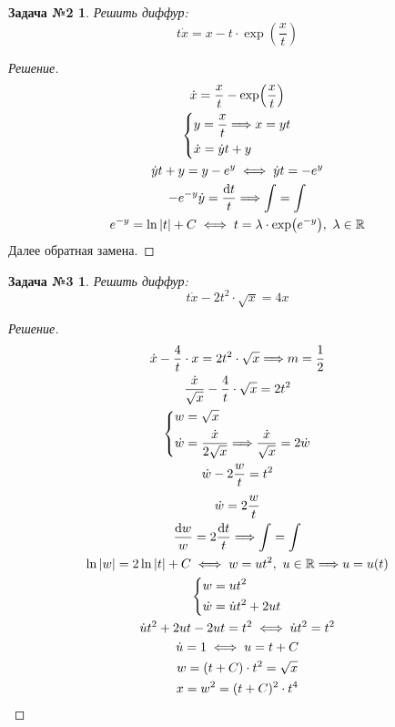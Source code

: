 \documentclass[a4paper,12pt]{article}
\newtheorem*{task2}{Задача №2}
\newtheorem*{task3}{Задача №3}
\newcommand{\R}{\mathbb{R}}
\renewcommand*\d{\mathop{}\!\mathrm{d}}
\newcommand{\dy}{\dot{y}}
\newcommand{\dw}{\dot{w}}
\newcommand{\du}{\dot{u}}
\newcommand{\dx}{\dot{x}}
\newcommand{\ds}{\displaystyle}
\begin{document}
\begin{task2}
Решить диффур:
\[t\dx = x - t\cdot \exp(\dfrac{x}{t})\]
\end{task2}
\begin{proof}[Решение]
	\begin{gather*}
		\dx = \dfrac{x}{t} - \exp(\dfrac{x}{t})\\
		\left\{\begin{gathered}
		y = \dfrac{x}{t} \Longrightarrow x = yt\hfill\\
		\dx = \dy t + y\hfill
		\end{gathered}\right.\\
		\dy t + y = y - e^y \iff \dy t = -e^y \\
		-e^{-y}\dy = \dfrac{\d t}{t} \Longrightarrow \ds\int = \int\\
		e^{-y} = \ln|t| + C \iff t = \lambda \cdot \exp(e^{-y}),\ \lambda \in \R
	\end{gather*}
	Далее обратная замена.
\end{proof}

\begin{task3}
Решить диффур:
\[t\dx - 2t^2\cdot \sqrt{x} = 4x\]
\end{task3}
\begin{proof}[Решение]
	\begin{gather*}
		\dx - \dfrac{4}{t} \cdot x = 2t^2 \cdot \sqrt{x} \Longrightarrow m = \dfrac{1}{2}\\
		\dfrac{\dx}{\sqrt{x}} - \dfrac{4}{t} \cdot \sqrt{x} = 2t^2\\
		\left\{\begin{gathered}
		w = \sqrt{x}\hfill\\
		\dw = \dfrac{\dx}{2\sqrt{x}} \Longrightarrow \dfrac{\dx}{\sqrt{x}} = 2\dw\hfill
		\end{gathered}\right.\\
		\dw - 2\dfrac{w}{t} = t^2
	\end{gather*}
	\begin{gather*}
		\dw = 2\dfrac{w}{t}\\
		\dfrac{\d w}{w} = 2\dfrac{\d t}{t} \Longrightarrow \ds\int = \int\\
		\ln|w| = 2\ln|t| + C \iff w = ut^2,\ u \in \R \Longrightarrow u = u(t)\\
		\left\{\begin{gathered}
		w = ut^2\hfill\\
		\dw = \du t^2 + 2ut\hfill
		\end{gathered}\right.\\
		\du t^2 + 2ut - 2ut = t^2 \iff \du t^2 = t^2\\
		\du = 1 \iff u = t + C\\
		w = (t + C) \cdot t^2 = \sqrt{x}\\
		x = w^2 = (t + C)^2 \cdot t^4
	\end{gather*}
\end{proof}
\end{document}
